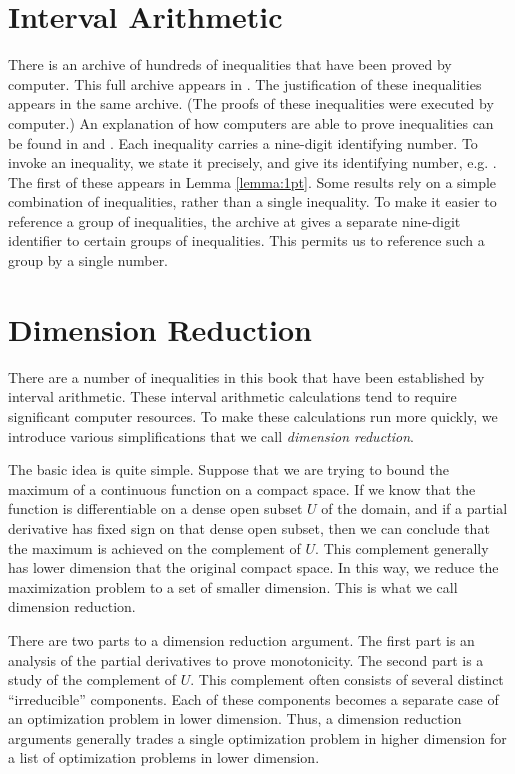 
\chapter{Interval Arithmetic}%
\label{sec:bounds-simplex}


There is an archive of hundreds of
inequalities that have been proved by computer.  This full archive
appears in \cite{web}.  The justification of these inequalities
appears in the same archive.  (The proofs of these inequalities were
executed by computer.)  An explanation of how computers are able to
prove inequalities can be found in \cite{algorithm} and
\cite{part1}. Each inequality carries a nine-digit identifying
number. To invoke an inequality, we state it precisely, and give its
identifying number, e.g. . The first of these
appears in Lemma \ref{lemma:1pt}.  Some results rely on a simple
combination of inequalities, rather than a single inequality.  To
make it easier to reference a group of inequalities, the archive at
\cite{web} gives a separate nine-digit identifier to certain groups
of inequalities.  This permits us to reference such a group by a
single number.
%


\chapter{Dimension Reduction}\label{chap:reduction}

There are a number of inequalities in this book that have been
established by interval arithmetic.  These interval arithmetic
calculations tend to require significant computer resources.  To
make these calculations run more quickly, we introduce various
simplifications that we call {\it dimension reduction}.

The basic idea is quite simple.  Suppose that we are trying to
bound the maximum of a continuous function on a compact space.  If
we know that the function is differentiable on a dense open subset
$U$ of the domain, and if a partial derivative has fixed sign on
that dense open subset, then we can conclude that the maximum is
achieved on the complement of $U$.   This complement generally has
lower dimension that the original compact space.  In this way, we
reduce the maximization problem to a set of smaller dimension.
This is what we call dimension reduction.

There are two parts to a dimension reduction argument.  The first
part is an analysis of the partial derivatives to prove
monotonicity.  The second part is a study of the complement of
$U$.  This complement often consists of several distinct
``irreducible'' components.  Each of these components becomes a
separate case of an optimization problem in lower dimension. Thus,
a dimension reduction arguments generally trades a single
optimization problem in higher dimension for a list of
optimization problems in lower dimension.

